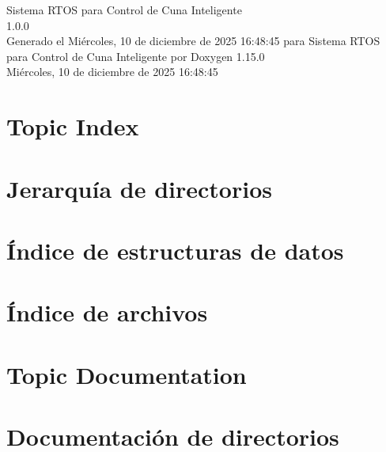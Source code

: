 \documentclass[twoside]{book}
\newcommand{\+}{\discretionary{\mbox{\scriptsize$\hookleftarrow$}}{}{}}
\newcommand{\clearemptydoublepage}{%
    \newpage{\pagestyle{empty}\cleardoublepage}%
  }
\begin{document}
  \raggedbottom
    \hypersetup{pageanchor=false,
                bookmarksnumbered=true,
                pdfencoding=unicode
               }
  \begin{titlepage}
  \vspace*{7cm}
  \begin{center}%
  {\Large Sistema RTOS para Control de Cuna Inteligente}\\
  [1ex]\large 1.\+0.\+0 \\
  \vspace*{1cm}
  {\large Generado el Miércoles, 10 de diciembre de 2025 16\+:48\+:45 para Sistema RTOS para Control de Cuna Inteligente por Doxygen 1.15.0}\\
    \vspace*{0.5cm}
    {\small Miércoles, 10 de diciembre de 2025 16:48:45}
  \end{center}
  \end{titlepage}
  \clearemptydoublepage
  \tableofcontents
  \clearemptydoublepage
  \hypersetup{pageanchor=true}

\chapter{Topic Index}

\chapter{Jerarquía de directorios}

\chapter{Índice de estructuras de datos}

\chapter{Índice de archivos}

\chapter{Topic Documentation}




\chapter{Documentación de directorios}

\end{document}
